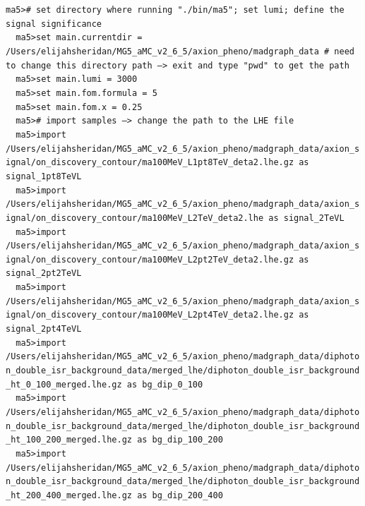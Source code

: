 \documentclass[a4paper, 10pt]{article}
\begin{document}
\texttt{ma5>\# set directory where running "./\-bin/\-ma5"; set lumi; define the signal significance\\
}
\texttt{ }\texttt{ }\texttt{ma5>set main.currentdir = /\-Users/\-elijahsheridan/\-MG5\_aMC\_v2\_6\_5/\-axion\_pheno/\-madgraph\_data \# need to change this directory path --> exit and type "pwd" to get the path\\
}
\texttt{ }\texttt{ }\texttt{ma5>set main.lumi = 3000\\
}
\texttt{ }\texttt{ }\texttt{ma5>set main.fom.formula = 5\\
}
\texttt{ }\texttt{ }\texttt{ma5>set main.fom.x = 0.25\\
}
\texttt{ }\texttt{ }\texttt{ma5>\# import samples --> change the path to the LHE file\\
}
\texttt{ }\texttt{ }\texttt{ma5>import /\-Users/\-elijahsheridan/\-MG5\_aMC\_v2\_6\_5/\-axion\_pheno/\-madgraph\_data/\-axion\_signal/\-on\_discovery\_contour/\-ma100MeV\_L1pt8TeV\_deta2.lhe.gz as signal\_1pt8TeVL\\
}
\texttt{ }\texttt{ }\texttt{ma5>import /\-Users/\-elijahsheridan/\-MG5\_aMC\_v2\_6\_5/\-axion\_pheno/\-madgraph\_data/\-axion\_signal/\-on\_discovery\_contour/\-ma100MeV\_L2TeV\_deta2.lhe as signal\_2TeVL\\
}
\texttt{ }\texttt{ }\texttt{ma5>import /\-Users/\-elijahsheridan/\-MG5\_aMC\_v2\_6\_5/\-axion\_pheno/\-madgraph\_data/\-axion\_signal/\-on\_discovery\_contour/\-ma100MeV\_L2pt2TeV\_deta2.lhe.gz as signal\_2pt2TeVL\\
}
\texttt{ }\texttt{ }\texttt{ma5>import /\-Users/\-elijahsheridan/\-MG5\_aMC\_v2\_6\_5/\-axion\_pheno/\-madgraph\_data/\-axion\_signal/\-on\_discovery\_contour/\-ma100MeV\_L2pt4TeV\_deta2.lhe.gz as signal\_2pt4TeVL\\
}
\texttt{ }\texttt{ }\texttt{ma5>import /\-Users/\-elijahsheridan/\-MG5\_aMC\_v2\_6\_5/\-axion\_pheno/\-madgraph\_data/\-diphoton\_double\_isr\_background\_data/\-merged\_lhe/\-diphoton\_double\_isr\_background\_ht\_0\_100\_merged.lhe.gz as bg\_dip\_0\_100\\
}
\texttt{ }\texttt{ }\texttt{ma5>import /\-Users/\-elijahsheridan/\-MG5\_aMC\_v2\_6\_5/\-axion\_pheno/\-madgraph\_data/\-diphoton\_double\_isr\_background\_data/\-merged\_lhe/\-diphoton\_double\_isr\_background\_ht\_100\_200\_merged.lhe.gz as bg\_dip\_100\_200\\
}
\texttt{ }\texttt{ }\texttt{ma5>import /\-Users/\-elijahsheridan/\-MG5\_aMC\_v2\_6\_5/\-axion\_pheno/\-madgraph\_data/\-diphoton\_double\_isr\_background\_data/\-merged\_lhe/\-diphoton\_double\_isr\_background\_ht\_200\_400\_merged.lhe.gz as bg\_dip\_200\_400\\
}
\end{document}
